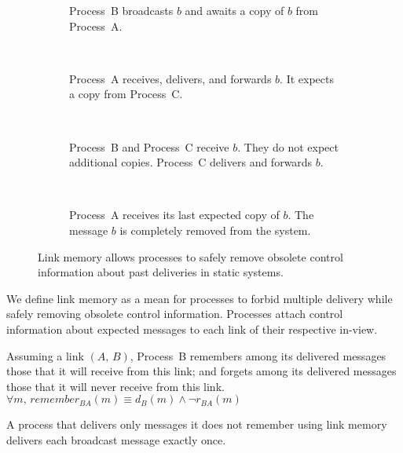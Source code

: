 \begin{figure*}[t]
  \begin{center}   
    \begin{subfigure}[t]{0.23\textwidth}
      
      \caption{\label{fig:memorylinkA}Process~B broadcasts $b$ and awaits a copy
        of $b$ from Process~A.}
    \end{subfigure}
    ~
    \begin{subfigure}[t]{0.23\textwidth}
      \caption{\label{fig:memorylinkB}Process~A receives, delivers, and forwards
        $b$. It expects a copy from Process~C.}
    \end{subfigure}
    ~
    \begin{subfigure}[t]{0.23\textwidth}
      \caption{\label{fig:memorylinkC}Process~B and Process~C receive $b$. They
        do not expect additional copies. Process~C delivers and forwards $b$.}
    \end{subfigure}
    ~
    \begin{subfigure}[t]{0.23\textwidth}
      
      \caption{\label{fig:memorylinkD}Process~A receives its last expected copy
      of $b$. The message $b$ is completely removed from the system.}
    \end{subfigure}
    \caption{\label{fig:memorylink}Link memory allows processes to safely remove
      obsolete control information about past deliveries in static systems.}
  \end{center}
\end{figure*}


We define link memory as a mean for processes to forbid multiple delivery while
safely removing obsolete control information. Processes attach control
information about expected messages to each link of their respective in-view.


\begin{definition}
  Assuming a link $(A,\, B)$, Process~B remembers among its delivered messages
  those that it will receive from this link; and forgets among its delivered
  messages those that it will never receive from this link.
  $\forall m,\, remember_{BA}(m) \equiv d_B(m) \wedge \neg r_{BA}(m)$
\end{definition}

\begin{theorem}
  A process that delivers only messages it does not remember using link memory
  delivers each broadcast message exactly once.
\end{theorem}

